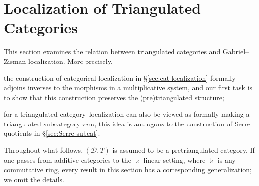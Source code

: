 
\section{Localization of Triangulated Categories}\label{sec:triangulated-localization}
\hypertarget{o014.aljabr2.chapter4.triangulated-localization}{ }

This section examines the relation between triangulated categories and
Gabriel--Zisman localization. More precisely,
\begin{compactitem}
	\item the construction of categorical localization in
	\S\ref{sec:cat-localization} formally adjoins inverses to the morphisms in
	a multiplicative system, and our first task is to show that this
	construction preserves the (pre)triangulated structure;
	\item for a triangulated category, localization can also be viewed as
	formally making a triangulated subcategory zero; this idea is analogous to
	the construction of Serre quotients in \S\ref{sec:Serre-subcat}.
\end{compactitem}

Throughout what follows, $(\mathcal{D}, T)$ is assumed to be a
pretriangulated category. If one passes from additive categories to the
$\Bbbk$-linear setting, where $\Bbbk$ is any commutative ring, every result
in this section has a corresponding generalization; we omit the details.

